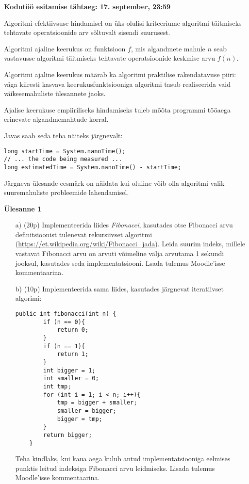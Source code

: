 \documentclass[a4paper]{article}
\begin{document}
\textbf{Kodutöö esitamise tähtaeg: 17. september, 23:59}

Algoritmi efektiivsuse hindamisel on üks olulisi kriteeriume algoritmi
täitmiseks tehtavate operatsioonide arv sõltuvalt sisendi suurusest.


Algoritmi ajaline keerukus on funktsioon $f$, mis algandmete
mahule $n$ seab vastavusse algoritmi täitmiseks tehtavate operatsioonide keskmise arvu $f(n)$. 

Algoritmi ajaline keerukus määrab ka algoritmi praktilise
rakendatavuse piiri: väga kiiresti kasvava keerukusfunktsiooniga
algoritmi tasub realiseerida vaid väikesemahuliste ülesannete jaoks.

Ajalise keerukuse empiiriliseks hindamiseks tuleb mõõta programmi tööaega erinevate algandmemahtude
korral.

Javas saab seda teha näiteks järgnevalt:

\begin{lstlisting}
long startTime = System.nanoTime();    
// ... the code being measured ...    
long estimatedTime = System.nanoTime() - startTime;
\end{lstlisting}

Järgneva ülesande eesmärk on näidata kui oluline võib olla algoritmi valik suuremahuliste probleemide lahendamisel.
\begin{problem}
\textbf{Ülesanne 1}
\begin{enumerate}
   \item[a)] (20p) Implementeerida liides \textit{Fibonacci}, kasutades otse Fibonacci arvu definitsioonist tulenevat rekursiivset algoritmi (\url{https://et.wikipedia.org/wiki/Fibonacci_jada}). Leida suurim indeks, millele vastavat Fibonacci arvu on 
arvuti võimeline välja arvutama 1 sekundi jooksul, kasutades seda implementatsiooni. Lsada tulemus Moodle'isse kommentaarina. 
    \item[b)] (10p) Implementeerida sama liides, kasutades järgnevat iteratiivset algorimi: 
\begin{lstlisting}
public int fibonacci(int n) {
        if (n == 0){
            return 0;
        }
        if (n == 1){
            return 1;
        }
        int bigger = 1;
        int smaller = 0;
        int tmp;
        for (int i = 1; i < n; i++){
            tmp = bigger + smaller;
            smaller = bigger;
            bigger = tmp;
        }
        return bigger;
    }
\end{lstlisting}
Teha kindlaks, kui kaua aega kulub antud implementatsiooniga eelmises punktis leitud indeksiga Fibonacci arvu leidmiseks. Lisada tulemus Moodle'isse kommentaarina.

\end{enumerate}

\end{problem}
\end{document}

